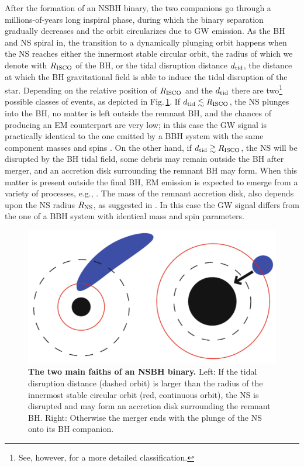 \documentclass[binding=0.6cm, LaM]{sapthesis}
\begin{document}
        After the formation of an NSBH binary, the two companions go through a millions-of-years long inspiral phase,
        during which the binary separation gradually decreases and the orbit circularizes due to GW emission.
        As the BH and NS spiral in, the transition to a dynamically plunging orbit happens
        when the NS reaches either the innermost stable circular orbit, the radius of which we denote with $R_{\rm ISCO}$ of the BH, or the tidal disruption distance $d_{\rm tid}$,
        the distance at which the BH gravitational field is able to induce the tidal disruption of the star.
        Depending on the relative position of $R_{\rm ISCO}$ and the $d_{\rm tid}$ there are
        two\footnote{See, however, \cite{165} for a more detailed classification.} possible classes of events, as depicted in Fig.\,\ref{fig:nsbh}.
        If $d_{\rm tid} \lesssim R_{\rm ISCO}$, the NS plunges into the BH, no matter is left outside the remnant BH,
        and the chances of producing an EM counterpart are very low; in this case the GW signal is practically identical to the one emitted by a BBH system with the same component masses and spins \cite{163, 164, 165, 166, 167}.
        On the other hand, if $d_{\rm tid} \gtrsim R_{\rm ISCO}$, the NS will be disrupted by the BH tidal field, some debris may remain outside the BH after merger, and an accretion disk surrounding the remnant BH may form.
        When this matter is present outside the final BH, EM emission is expected to emerge from a variety of processes, e.g., \cite{169}.
        The mass of the remnant accretion disk, also depends upon the NS radius $R_{\rm NS}$, as suggested in \cite{168}.
        In this case the GW signal differs from the one of a BBH system with identical mass and spin parameters.
        \begin{figure}[!t]
          \label{nsbh}
          \includegraphics[scale=0.45]{nsbh}
          \centering
          \caption{{\bf The two main faiths of an NSBH binary.} Left: If the tidal disruption distance (dashed orbit) is larger than the radius of the innermost stable circular orbit (red, continuous orbit), the NS is disrupted and may form an accretion disk surrounding the remnant BH.  Right: Otherwise the merger ends with the plunge of the NS onto its BH companion.}
          \label{fig:nsbh}
        \end{figure}
\end{document}
